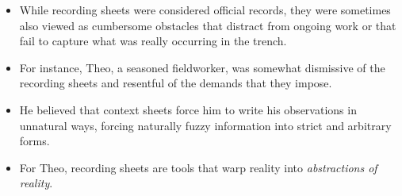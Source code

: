 \documentclass{article}
\begin{document}
\begin{itemize}
  \item While recording sheets were considered official records, they were sometimes also viewed as cumbersome obstacles that distract from ongoing work or that fail to capture what was really occurring in the trench.
  \item For instance, Theo, a seasoned fieldworker, was somewhat dismissive of the recording sheets and resentful of the demands that they impose.
  \item He believed that context sheets force him to write his observations in unnatural ways, forcing naturally fuzzy information into strict and arbitrary forms.
  \item For Theo, recording sheets are tools that warp reality into \emph{abstractions of reality}.
\end{itemize}
\end{document}
